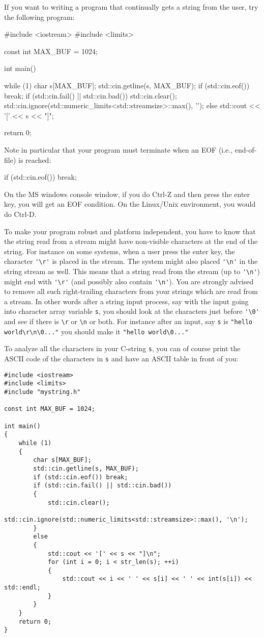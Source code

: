 If you want to writing a program that continually gets a string from the user,
try the following program:
\begin{console}[fontsize=\small]
#include <iostream> 
#include <limits> 

const int MAX_BUF = 1024; 

int main() 
{ 
    while (1) 
    { 
        char s[MAX_BUF]; 
        std::cin.getline(s, MAX_BUF); 
        if (std::cin.eof()) break; 
        if (std::cin.fail() || std::cin.bad()) 
        { 
            std::cin.clear(); 
            std::cin.ignore(std::numeric_limits<std::streamsize>::max(), '\n');
        }
        else
        {
            std::cout << '[' << s << "]\n";
        }
    }

    return 0;
} 
\end{console}
Note in particular that your program must terminate when an EOF
(i.e., end-of-file) is reached:
\begin{console}[fontsize=\small]
if (std::cin.eof()) break;
\end{console}
On the MS windows console window, if you do Ctrl-Z and then
press the enter key, you will get an EOF condition.
On the Linux/Unix environment, you would do Ctrl-D.

To make your program robust and platform independent,
you have to know that the string read from a stream might
have non-visible characters at the end of the string.
For instance on some systems,
when a user press the enter key, the character
\verb!'\r'! is placed in the stream.
The system might also placed \verb!'\n'! in the string stream as well.
This means that a string read from the stream (up to \verb!'\n'!)
might end with \verb!'\r'! (and possibly also contain \verb!'\n'!).
You are strongly advised to remove all such right-trailing characters from
your strings which are read from a stream.
In other words after a string input process, say with the input
going into character array variable \verb!s!,
you should look at the characters just before \verb!'\0'!
and see if there is \verb!\r! or \verb!\n! or both.
For instance after an input, say \verb!s! is
\verb!"hello world\r\n\0..."!
you should make it
\verb!"hello world\0..."!


To analyze all the characters in your C-string \verb!s!, you can
of course print the ASCII code of the characters
in \verb!s! and have an ASCII table in front of you:
{\small
\begin{Verbatim}[frame=single]
#include <iostream> 
#include <limits> 
#include "mystring.h"

const int MAX_BUF = 1024; 

int main() 
{ 
    while (1) 
    { 
        char s[MAX_BUF]; 
        std::cin.getline(s, MAX_BUF); 
        if (std::cin.eof()) break; 
        if (std::cin.fail() || std::cin.bad()) 
        { 
            std::cin.clear(); 
            std::cin.ignore(std::numeric_limits<std::streamsize>::max(), '\n');
        }
        else
        {
            std::cout << '[' << s << "]\n";
            for (int i = 0; i < str_len(s); ++i)
            {
                std::cout << i << ' ' << s[i] << ' ' << int(s[i]) << std::endl;
            }
        }
    }
    return 0;
} 
\end{Verbatim}
}

